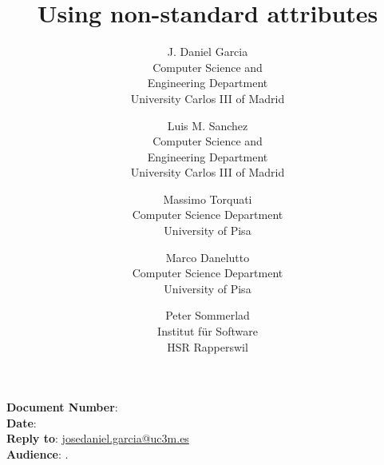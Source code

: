 \documentclass[10pt,a4paper,oneside,final,notitlepage]{article}%
\begin{document}


\begin{flushright}
\textbf{Document Number}: \texttt{\paperid}\\
\textbf{Date}: \paperdate\\
\textbf{Reply to}: \url{josedaniel.garcia@uc3m.es}\\
\textbf{Audience}: \paperaudience.
\end{flushright}

\title{Using non-standard attributes}
\author{J. Daniel Garcia\\
Computer Science and\\ Engineering Department\\
University Carlos III of Madrid
\and
Luis M. Sanchez\\
Computer Science and\\ Engineering Department\\
University Carlos III of Madrid
\and
Massimo Torquati\\
Computer Science Department\\
University of Pisa
\and
Marco Danelutto\\
Computer Science Department\\
University of Pisa
\and
Peter Sommerlad\\
Institut f\"{u}r Software\\
HSR Rapperswil
}
\date{}

\begingroup
\let\newpage\relax%
\maketitle
\endgroup









\end{document}
